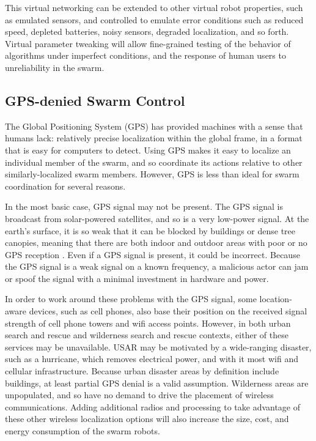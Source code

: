 \documentclass[]{article}
\begin{document}
This virtual networking can be extended to other virtual robot properties, such as emulated sensors, and controlled to emulate error conditions such as reduced speed, depleted batteries, noisy sensors, degraded localization, and so forth.
Virtual parameter tweaking will allow fine-grained testing of the behavior of algorithms under imperfect conditions, and the response of human users to unreliability in the swarm. 

\subsection{GPS-denied Swarm Control}

The Global Positioning System (GPS) has provided machines with a sense that humans lack: relatively precise localization within the global frame, in a format that is easy for computers to detect.
Using GPS makes it easy to localize an individual member of the swarm, and so coordinate its actions relative to other similarly-localized swarm members. 
However, GPS is less than ideal for swarm coordination for several reasons. 

In the most basic case, GPS signal may not be present. 
The GPS signal is broadcast from solar-powered satellites, and so is a very low-power signal.
At the earth's surface, it is so weak that it can be blocked by buildings or dense tree canopies, meaning that there are both indoor and outdoor areas with poor or no GPS reception \cite{zheng2005quantitative}. 
Even if a GPS signal is present, it could be incorrect. 
Because the GPS signal is a weak signal on a known frequency, a malicious actor can jam or spoof the signal with a minimal investment in hardware and power\cite{montgomery2009receiver}.

In order to work around these problems with the GPS signal, some location-aware devices, such as cell phones, also base their position on the received signal strength of cell phone towers and wifi access points. 
However, in both urban search and rescue and wilderness search and rescue contexts, either of these services may be unavailable. 
USAR may be motivated by a wide-ranging disaster, such as a hurricane, which removes electrical power, and with it most wifi and cellular infrastructure.
Because urban disaster areas by definition include buildings, at least partial GPS denial is a valid assumption.  
Wilderness areas are unpopulated, and so have no demand to drive the placement of wireless communications. 
Adding additional radios and processing to take advantage of these other wireless localization options will also increase the size, cost, and energy consumption of the swarm robots.
\end{document}
